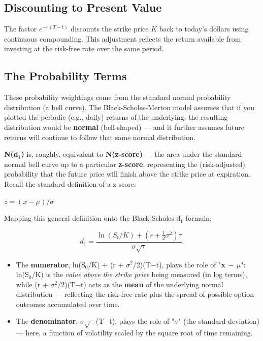 \documentclass[12pt,openany]{book}
\theoremstyle{definition}
\theoremstyle{remark}
\begin{document}
\subsection{Discounting to Present Value}

The factor \(e^{-r(T-t)}\) discounts the strike price \(K\) back to today's
dollars using continuous compounding. This adjustment reflects the return
available from investing at the risk-free rate over the same period.

\subsection{The Probability Terms}

These probability weightings come from the standard normal probability distribution (a bell curve). The Black-Scholes-Merton model assumes that if you plotted the periodic (e.g., daily) returns of the underlying, the resulting distribution would be \textbf{normal} (bell-shaped) --- and it further assumes future returns will continue to follow that same normal distribution.

\textbf{N(d\(_1\))} is, roughly, equivalent to \textbf{N(z-score)} --- the area under the standard normal bell curve up to a particular \textbf{z-score}, representing the (risk-adjusted) probability that the future price will finish above the strike price at expiration. Recall the standard definition of a z-score:

\(z=(x-\mu)/\sigma\)

Mapping this general definition onto the Black-Scholes d\(_1\) formula:

\[d_1=\frac{\ln(S_t/K)+(r+\tfrac12\sigma^2)\tau}{\sigma\sqrt{\tau}}.\]

\begin{itemize}
\item The \textbf{numerator}, ln(S\(_0\)/K) + (r + \(\sigma\)\(^2\)/2)(T\(-\)t), plays the role of "\textbf{x \(-\) \(\mu\)}": ln(S\(_0\)/K) is the \emph{value above the strike price} being measured (in log terms), while (r + \(\sigma\)\(^2\)/2)(T\(-\)t) acts as the \textbf{mean} of the underlying normal distribution --- reflecting the risk-free rate plus the spread of possible option outcomes accumulated over time.


\item The \textbf{denominator}, \(\sigma\)\(\sqrt{\phantom{x}}\)(T\(-\)t), plays the role of "\textbf{\(\sigma\)}" (the standard deviation) --- here, a function of volatility scaled by the square root of time remaining.


\end{itemize}
\end{document}
